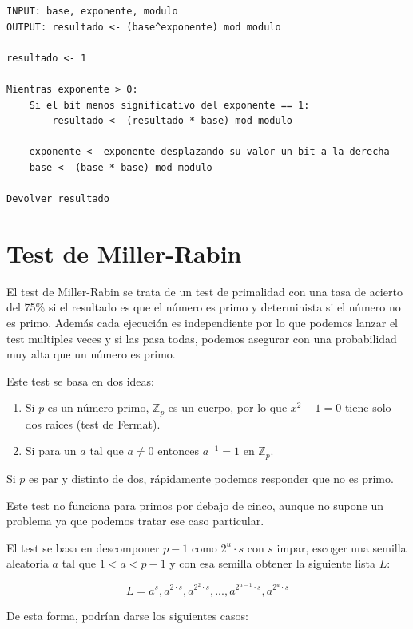 \documentclass[12pt, spanish]{article}
\begin{document}
\newpage

\begin{lstlisting}[caption={Algoritmo de exponenciación modular}]
INPUT: base, exponente, modulo
OUTPUT: resultado <- (base^exponente) mod modulo

resultado <- 1

Mientras exponente > 0:
	Si el bit menos significativo del exponente == 1:
		resultado <- (resultado * base) mod modulo

	exponente <- exponente desplazando su valor un bit a la derecha
	base <- (base * base) mod modulo

Devolver resultado
\end{lstlisting}


\section{Test de Miller-Rabin}

El test de Miller-Rabin se trata de un test de primalidad con una tasa de acierto del 75\% si el resultado es que el número es primo y determinista si el número no es primo. Además cada ejecución es independiente por lo que podemos lanzar el test multiples veces y si las pasa todas, podemos asegurar con una probabilidad muy alta que un número es primo.

Este test se basa en dos ideas:

\begin{enumerate}
	\item Si $p$ es un número primo, $\mathbb{Z}_p$ es un cuerpo, por lo que $x^2 - 1 = 0$ tiene solo dos raices (test de Fermat).
	\item Si para un $a$ tal que $a \neq 0$ entonces $a^{-1} = 1$ en $\mathbb{Z}_p$.
\end{enumerate}

Si $p$ es par y distinto de dos, rápidamente podemos responder que no es primo.

Este test no funciona para primos por debajo de cinco, aunque no supone un problema ya que podemos tratar ese caso particular.

El test se basa en descomponer $p - 1$ como $2^u \cdot s$ con $s$ impar, escoger una semilla aleatoria $a$ tal que $1 < a < p - 1$ y con esa semilla obtener la siguiente lista $L$:

$$L = {a^s, a^{2 \cdot s}, a^{2^2 \cdot s}, ..., a^{2^{u - 1} \cdot s}, a^{2^{u} \cdot s}}$$

De esta forma, podrían darse los siguientes casos:
\end{document}
